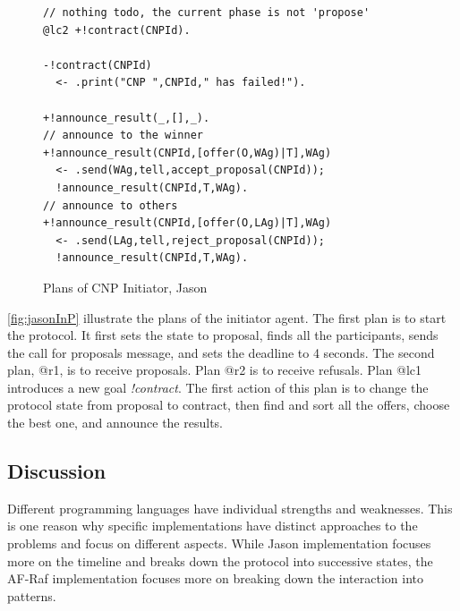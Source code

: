 \documentclass[a4paper,12pt,oneside,fleqn]{book} %
\begin{document}
{\begin{figure}
\begin{verbatim}
// nothing todo, the current phase is not 'propose'
@lc2 +!contract(CNPId).

-!contract(CNPId)
  <- .print("CNP ",CNPId," has failed!").

+!announce_result(_,[],_).
// announce to the winner
+!announce_result(CNPId,[offer(O,WAg)|T],WAg)
  <- .send(WAg,tell,accept_proposal(CNPId));
  !announce_result(CNPId,T,WAg).
// announce to others
+!announce_result(CNPId,[offer(O,LAg)|T],WAg)
  <- .send(LAg,tell,reject_proposal(CNPId));
  !announce_result(CNPId,T,WAg).
\end{verbatim}
\caption{Plans of CNP Initiator, Jason}
\label{fig:jasonInP}
\end{figure} %

\autoref{fig:jasonInP} illustrate the plans of the initiator agent. The
first plan is to start the protocol. It first sets the state to proposal,
finds all the participants, sends the call for proposals message, and sets
the deadline to 4 seconds. The second plan, @r1, is to receive proposals.
Plan @r2 is to receive refusals. Plan @lc1 introduces a new goal
\textit{!contract}. The first action of this plan is to change the protocol
state from proposal to contract, then find and sort all the offers,
choose the best one, and announce the results.





\subsection{Discussion} %
Different programming languages have individual strengths and weaknesses.
This is one reason why specific implementations have distinct approaches to
the problems and focus on different aspects. While Jason implementation
focuses more on the timeline and breaks down the protocol into successive
states, the AF-Raf implementation focuses more on breaking down the
interaction into patterns.

}
\end{document}
